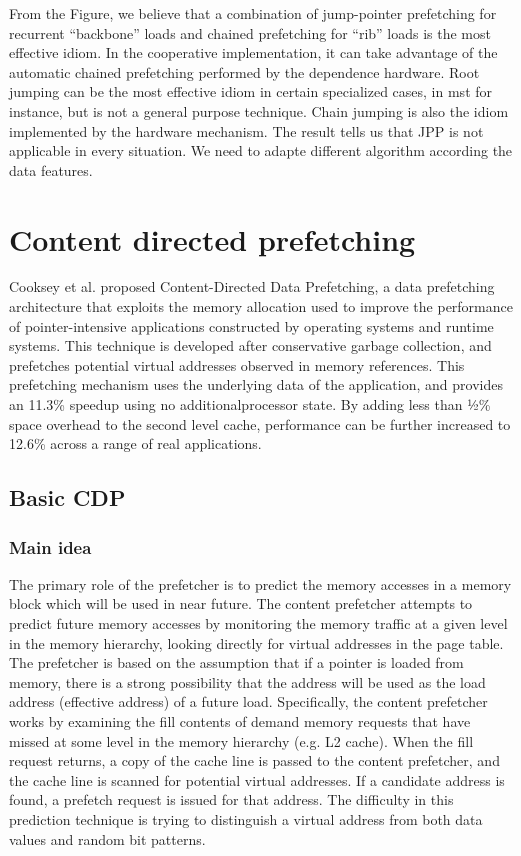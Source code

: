 \documentclass{acm_proc_article-sp}
\begin{document}
From the Figure, we believe that  a combination
of jump-pointer prefetching for recurrent “backbone”
loads and chained prefetching for “rib” loads is the most
effective idiom. In the cooperative implementation, it can take
advantage of the automatic chained 
prefetching performed by the dependence hardware. 
Root jumping can be the most effective idiom in certain specialized
cases, in mst for instance, but is not a general purpose 
technique. Chain jumping is also the idiom implemented by the hardware
mechanism.
The result tells us that JPP is not applicable in every
situation. We need to adapte different algorithm according the data
features. 
 
\section{Content directed prefetching}

Cooksey et al. proposed Content-Directed Data Prefetching, a data
prefetching architecture that exploits the memory allocation used to
improve the performance of pointer-intensive applications constructed
by operating systems and runtime systems. This technique is developed
after conservative garbage collection, and prefetches potential virtual
addresses observed in memory references. This prefetching mechanism uses the
underlying data of the application, and provides an 11.3\% speedup
using no additionalprocessor state. By adding less than 1⁄2\% space
overhead to the second level cache, performance can be further
increased to 12.6\% across a range of real applications. 
\cite{Cooksey:2002:SCD:635506.605427}

\subsection{Basic CDP}

\subsubsection{Main idea}

The primary role of the prefetcher is to predict the  memory
accesses in a memory block which will be used in near future. The
content prefetcher attempts to predict future memory 
accesses by monitoring the memory traffic at a given level in the
memory hierarchy, looking directly for virtual addresses in the page
table. The prefetcher is based on the assumption that if a pointer 
is loaded from memory, there is a strong possibility that the address
will be used as the load address (effective address) of a future load.
Specifically, the content prefetcher works by examining the fill
contents of demand memory requests that have missed at some level in 
the memory hierarchy (e.g. L2 cache). When the fill request returns,
a copy of the cache line is passed to the content prefetcher, 
and the cache line is scanned for potential virtual addresses. If a
candidate address is found, a prefetch request is issued for that
address. The difficulty in this prediction technique is
trying to distinguish a virtual address from both data values and random bit
patterns.
\end{document}

